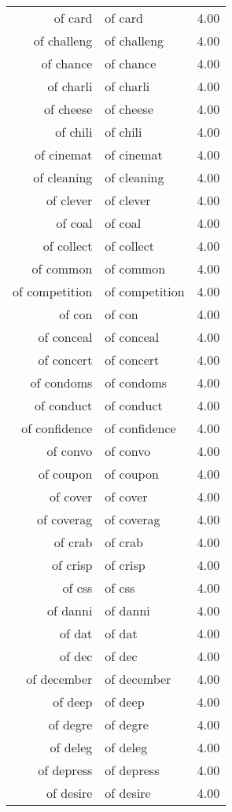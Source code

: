 \begin{table}[ht]
\begin{tabular}{rlr}
  of card & of card & 4.00 \\ 
  of challeng & of challeng & 4.00 \\ 
  of chance & of chance & 4.00 \\ 
  of charli & of charli & 4.00 \\ 
  of cheese & of cheese & 4.00 \\ 
  of chili & of chili & 4.00 \\ 
  of cinemat & of cinemat & 4.00 \\ 
  of cleaning & of cleaning & 4.00 \\ 
  of clever & of clever & 4.00 \\ 
  of coal & of coal & 4.00 \\ 
  of collect & of collect & 4.00 \\ 
  of common & of common & 4.00 \\ 
  of competition & of competition & 4.00 \\ 
  of con & of con & 4.00 \\ 
  of conceal & of conceal & 4.00 \\ 
  of concert & of concert & 4.00 \\ 
  of condoms & of condoms & 4.00 \\ 
  of conduct & of conduct & 4.00 \\ 
  of confidence & of confidence & 4.00 \\ 
  of convo & of convo & 4.00 \\ 
  of coupon & of coupon & 4.00 \\ 
  of cover & of cover & 4.00 \\ 
  of coverag & of coverag & 4.00 \\ 
  of crab & of crab & 4.00 \\ 
  of crisp & of crisp & 4.00 \\ 
  of css & of css & 4.00 \\ 
  of danni & of danni & 4.00 \\ 
  of dat & of dat & 4.00 \\ 
  of dec & of dec & 4.00 \\ 
  of december & of december & 4.00 \\ 
  of deep & of deep & 4.00 \\ 
  of degre & of degre & 4.00 \\ 
  of deleg & of deleg & 4.00 \\ 
  of depress & of depress & 4.00 \\ 
  of desire & of desire & 4.00 \\ 

\end{tabular}
\end{table}
